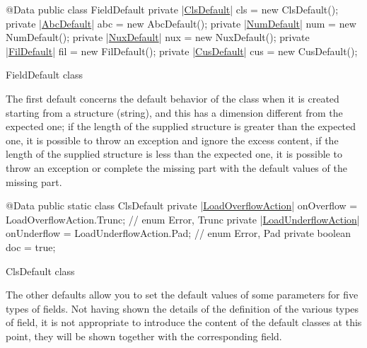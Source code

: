 \documentclass[a4paper,10pt]{report}
\newenvironment{elisting}[1][H]
  {\captionsetup{aboveskip=0pt}\begin{listing}[#1]}
  {\end{listing}%
}
\begin{document}
\begin{elisting}[!htb]
\begin{javacode}
@Data
public class FieldDefault {
    private |\hyperref[lst:ClsDefault]{ClsDefault}| cls = new ClsDefault();
    private |\hyperref[lst:AbcDefault]{AbcDefault}| abc = new AbcDefault();
    private |\hyperref[lst:NumDefault]{NumDefault}| num = new NumDefault();
    private |\hyperref[lst:NuxDefault]{NuxDefault}| nux = new NuxDefault();
    private |\hyperref[lst:FilDefault]{FilDefault}| fil = new FilDefault();
    private |\hyperref[lst:CusDefault]{CusDefault}| cus = new CusDefault();
}
\end{javacode}
\caption{FieldDefault class}
\label{lst:FieldDefault}
\end{elisting}
The first default concerns the default behavior of the class when it is created 
starting from a structure (string), and this has a dimension different from the 
expected one; if the length of the supplied structure is greater than the 
expected one, it is possible to throw an exception and ignore the excess 
content, if the length of the supplied structure is less than the expected one, 
it is possible to throw an exception or complete the missing part with the 
default values of the missing part.

\begin{elisting}[!htb]
\begin{javacode}
@Data
public static class ClsDefault {
    private |\hyperref[lst:LoadOverflowAction]{LoadOverflowAction}| onOverflow = LoadOverflowAction.Trunc;   // enum {Error, Trunc}
    private |\hyperref[lst:LoadUnderflowAction]{LoadUnderflowAction}| onUnderflow = LoadUnderflowAction.Pad;  // enum {Error, Pad}
    private boolean doc = true;
}
\end{javacode}
\caption{ClsDefault class}
\label{lst:ClsDefault}
\end{elisting}

The other defaults allow you to set the default values of some parameters for 
five types of fields. Not having shown the details of the definition of the 
various types of field, it is not appropriate to introduce the content of the 
default classes at this point, they will be shown together with the 
corresponding field.
\end{document}
